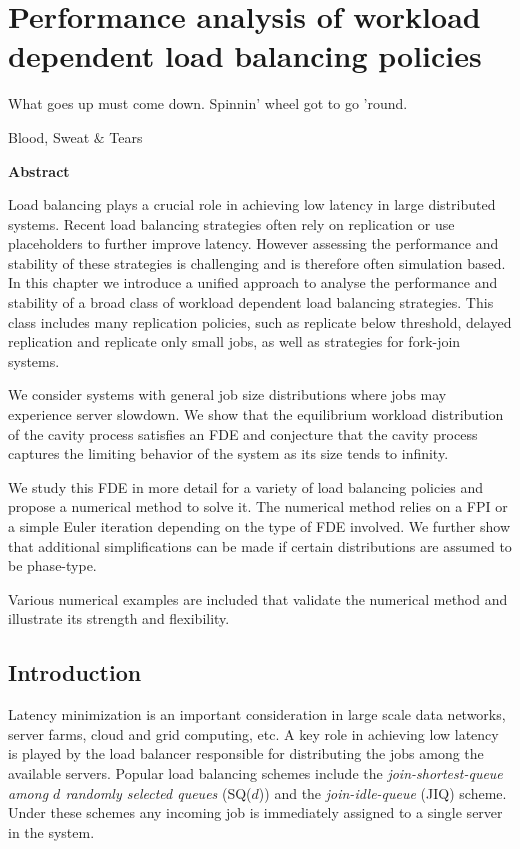 \documentclass[12pt]{report}
\newenvironment{chapabstract}{%
    \begin{center}%
      \bfseries Abstract
    \end{center}}%
   {\par}
\begin{document}
\chapter{Performance analysis of workload dependent load balancing policies}\label{chap:workload_dependent}
\epigraph{What goes up must come down.
	Spinnin' wheel got to go 'round.}{Blood, Sweat $\&$ Tears}
\begin{chapabstract}
Load balancing plays a crucial role in achieving low latency in large distributed systems. Recent load balancing strategies often rely on replication or use placeholders to further improve latency. However assessing the performance and stability of these strategies is challenging and is therefore often simulation based. In this chapter we introduce a unified approach to analyse the performance and stability of a broad class of workload dependent load balancing strategies. This class includes many replication policies, such as replicate below threshold, delayed replication and replicate only small jobs, as well as strategies for fork-join systems.

We consider systems with general job size distributions where jobs may experience server slowdown. We show that the equilibrium workload distribution of the cavity process
satisfies an FDE and conjecture that the cavity process captures
the limiting behavior of the system as its size tends to infinity.

We study this FDE in more detail for a variety of load balancing policies and propose a numerical method to solve it. The numerical method relies on a FPI or a simple Euler iteration depending on the type of FDE involved. We further show that additional simplifications can be made if certain distributions are assumed to be phase-type.

Various numerical examples are included that validate the numerical method and illustrate its strength and flexibility.
\end{chapabstract}

\section{Introduction}
Latency minimization is an important consideration in large scale data networks,  server farms, cloud and grid computing, etc. A key role in achieving low latency is played by the load balancer responsible
for distributing the jobs among the available servers. Popular load balancing schemes
include the {\it join-shortest-queue among $d$ randomly selected queues } (SQ($d$))
\cite{mitzenmacher2,vvedenskaya3,bramsonLB,aghajani2017}
and the {\it join-idle-queue} (JIQ)  \cite{lu1,stolyar1,foss_stolyar_2017} scheme. 
Under these schemes any incoming job is immediately assigned to a single server in the system.
\end{document}
